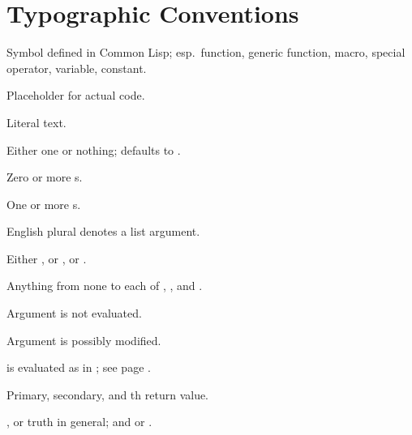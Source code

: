 %
%
\section*{Typographic Conventions}

\begin{LIST}{1cm}

  {
  Symbol defined in Common Lisp; esp.\ function, generic function,
  macro, special operator, variable, constant.
  }

  {
  Placeholder for actual code.
  }

  {
  Literal text.
  }

  {
  Either one  or nothing; defaults to .
  }

  {
  Zero or more s.
  }

  {
  One or more s.
  }

  {
  English plural denotes a list argument.
  }

  {
  Either , or , or .
  }

  {
  Anything from none to each of , , and .
  }

  {
  Argument  is not evaluated.
  }

  {
  Argument  is possibly modified.
  }

  {
   is evaluated as in ; see page \pageref{:progn}.
  }

  {
  Primary, secondary, and th return value.
  }

  \IT{\T; \NIL\qquad\qquad\qquad}
  {
  , or truth in general; and  or \kwd{()}.
  }
  
\end{LIST}

